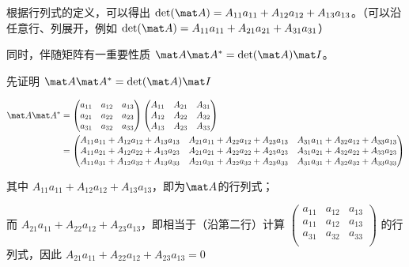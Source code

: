 根据行列式的定义，可以得出 $\det(\mat A) = A_{11}a_{11}+A_{12}a_{12}+A_{13}a_{13}$。（可以沿任意行、列展开，例如 $\det(\mat A) = A_{11}a_{11}+A_{21}a_{21}+A_{31}a_{31}$）

同时，伴随矩阵有一重要性质 $\mat A \mat A^* = \det(\mat A)\mat I$。

先证明 $\mat A \mat A^* = \det(\mat A)\mat I$

\begin{equation}
\begin{aligned}
\mat A \mat A^* &=
\begin{pmatrix}
a_{11}&a_{12}&a_{13}\\
a_{21}&a_{22}&a_{23}\\
a_{31}&a_{32}&a_{33}\\
\end{pmatrix}
\begin{pmatrix}
A_{11}&A_{21}&A_{31}\\
A_{12}&A_{22}&A_{32}\\
A_{13}&A_{23}&A_{33}\\
\end{pmatrix}\\
&=
\begin{pmatrix}
A_{11}a_{11}+A_{12}a_{12}+A_{13}a_{13}&A_{21}a_{11}+A_{22}a_{12}+A_{23}a_{13}&A_{31}a_{11}+A_{32}a_{12}+A_{33}a_{13}\\
A_{11}a_{21}+A_{12}a_{22}+A_{13}a_{23}&A_{21}a_{21}+A_{22}a_{22}+A_{23}a_{23}&A_{31}a_{21}+A_{32}a_{22}+A_{33}a_{23}\\
A_{11}a_{31}+A_{12}a_{32}+A_{13}a_{33}&A_{21}a_{31}+A_{22}a_{32}+A_{23}a_{33}&A_{31}a_{31}+A_{32}a_{32}+A_{33}a_{33}\\
\end{pmatrix}
\end{aligned}
\end{equation}

其中
$A_{11}a_{11}+A_{12}a_{12}+A_{13}a_{13}$，即为$\mat A$的行列式；

而
$A_{21}a_{11}+A_{22}a_{12}+A_{23}a_{13}$，即相当于（沿第二行）计算
$\begin{pmatrix}
a_{11}&a_{12}&a_{13}\\
a_{11}&a_{12}&a_{13}\\
a_{31}&a_{32}&a_{33}\\
\end{pmatrix}$
的行列式，因此 $A_{21}a_{11}+A_{22}a_{12}+A_{23}a_{13}=0$

